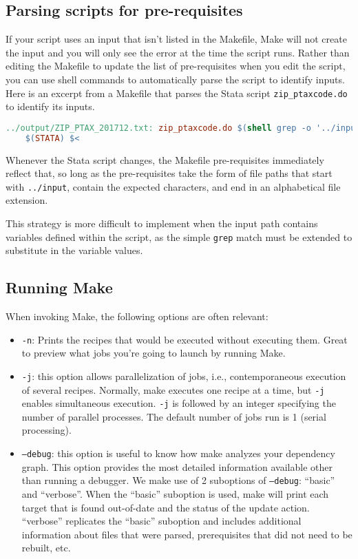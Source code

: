 \subsection{Parsing scripts for pre-requisites}

If your script uses an input that isn't listed in the Makefile,
Make will not create the input and you will only see the error at the time the script runs.
Rather than editing the Makefile to update the list of pre-requisites when you edit the script,
you can use shell commands to automatically parse the script to identify inputs.
Here is an excerpt from a Makefile that parses the Stata script \texttt{zip\_ptaxcode.do} to identify its inputs.
\begin{lstlisting}[language=make]
../output/ZIP_PTAX_201712.txt: zip_ptaxcode.do $(shell grep -o '../input/[A-Za-z0-9_]*\.[a-z]*' zip_ptaxcode.do) | ../output ../report run.sbatch
	$(STATA) $<
\end{lstlisting}
Whenever the Stata script changes, the Makefile pre-requisites immediately reflect that,
so long as the pre-requisites take the form of file paths that start with \texttt{../input}, contain the expected characters, and end in an alphabetical file extension.

This strategy is more difficult to implement when the input path contains variables defined within the script,
as the simple \texttt{grep} match must be extended to substitute in the variable values.

\subsection{Running Make}
When invoking Make, the following options are often relevant:
\begin{itemize}
	\item \texttt{-n}: Prints the recipes that would be executed without executing them. Great to preview what jobs you're going to launch by running Make.
	\item \texttt{-j}: this option allows parallelization of jobs, i.e., contemporaneous execution of several recipes.
	Normally, make executes one recipe at a time, but \texttt{-j} enables simultaneous execution.
	\texttt{-j} is followed by an integer specifying the number of parallel processes.
	The default number of jobs run is 1 (serial processing).
	\item \texttt{--debug}: this option is useful to know how make analyzes your dependency graph. This option provides the most detailed information available other than running a debugger.
	We make use of 2 suboptions of \texttt{--debug}: ``basic'' and ``verbose''.
	When the ``basic'' suboption is used, make will print each target that is found out-of-date and the status of the update action.
	``verbose'' replicates the ``basic'' suboption and includes additional information about files that were parsed, prerequisites that did not need to be rebuilt, etc.
\end{itemize}

